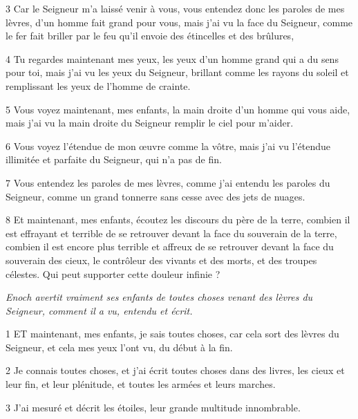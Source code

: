 \par 3 Car le Seigneur m'a laissé venir à vous, vous entendez donc les paroles de mes lèvres, d'un homme fait grand pour vous, mais j'ai vu la face du Seigneur, comme le fer fait briller par le feu qu'il envoie des étincelles et des brûlures,

\par 4 Tu regardes maintenant mes yeux, les yeux d'un homme grand qui a du sens pour toi, mais j'ai vu les yeux du Seigneur, brillant comme les rayons du soleil et remplissant les yeux de l'homme de crainte.

\par 5 Vous voyez maintenant, mes enfants, la main droite d'un homme qui vous aide, mais j'ai vu la main droite du Seigneur remplir le ciel pour m'aider.

\par 6 Vous voyez l'étendue de mon œuvre comme la vôtre, mais j'ai vu l'étendue illimitée et parfaite du Seigneur, qui n'a pas de fin.

\par 7 Vous entendez les paroles de mes lèvres, comme j'ai entendu les paroles du Seigneur, comme un grand tonnerre sans cesse avec des jets de nuages.

\par 8 Et maintenant, mes enfants, écoutez les discours du père de la terre, combien il est effrayant et terrible de se retrouver devant la face du souverain de la terre, combien il est encore plus terrible et affreux de se retrouver devant la face du souverain des cieux, le contrôleur des vivants et des morts, et des troupes célestes. Qui peut supporter cette douleur infinie ?


\par \textit{Enoch avertit vraiment ses enfants de toutes choses venant des lèvres du Seigneur, comment il a vu, entendu et écrit.}

\par 1 ET maintenant, mes enfants, je sais toutes choses, car cela sort des lèvres du Seigneur, et cela mes yeux l'ont vu, du début à la fin.

\par 2 Je connais toutes choses, et j'ai écrit toutes choses dans des livres, les cieux et leur fin, et leur plénitude, et toutes les armées et leurs marches.

\par 3 J'ai mesuré et décrit les étoiles, leur grande multitude innombrable.

